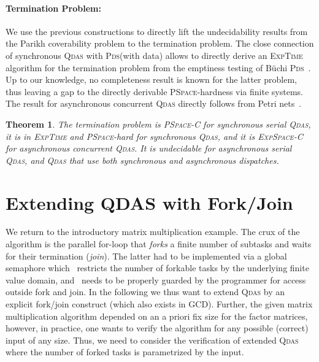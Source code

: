 \documentclass[runningheads,oribibl,]{article}
\newcommand{\pds}{\textsc{Pds}\xspace}
\newcommand{\qdas}{\textsc{Qdas}\xspace}
\newcommand{\dexpspacecomplete}{\textsc{ExpSpace-C}\xspace}
\newcommand{\pspace}{\textsc{PSpace}\xspace}
\newcommand{\pspacecomplete}{\textsc{PSpace-C}\xspace}
\newcommand{\dexptime}{\textsc{ExpTime}\xspace}
\newtheorem{theorem}{Theorem}{}
\begin{document}
\paragraph{\bf Termination Problem:}


We use the previous constructions to directly
lift the undecidability results from the Parikh coverability problem to the termination problem.
The close connection of synchronous \qdas with \pds (with data)
allows to directly derive an \dexptime algorithm for the termination problem from the emptiness testing of
Büchi \pds~\cite{esparza-j-2000-232-a}. Up to our knowledge,
no completeness result is known for the latter problem, thus leaving a gap to the directly derivable \pspace-hardness via finite systems.
The result for  asynchronous concurrent
\qdas directly follows from Petri nets~\cite{lipton,rackoff}.

\begin{theorem}\label{thm:termination}
  The termination problem is  \pspacecomplete for synchronous serial
  \qdas, it is in \dexptime and \pspace-hard for synchronous \qdas,
  and it is \dexpspacecomplete for asynchronous concurrent \qdas.
  It is undecidable for asynchronous serial \qdas, and \qdas that
  use both synchronous and asynchronous dispatches.
\end{theorem}



\section{Extending QDAS with Fork/Join\label{sec:forkjoin}}


We return to the introductory matrix multiplication example. The crux of the
algorithm is the parallel for-loop that \emph{forks} a finite number of subtasks and waits
for their termination (\emph{join}).  The latter had to be implemented via a global
semaphore which ~restricts the number of forkable tasks by the underlying
finite value domain, and ~needs to be properly guarded by the programmer for access outside fork and join.
In the following we thus
want to extend \qdas by an explicit fork/join construct (which also exists in GCD).
Further, the given matrix multiplication algorithm depended on an a priori fix size
for the factor matrices, however,
in practice, one wants to verify the algorithm for any possible (correct) input
of any size. Thus, we need to consider the verification of extended
\qdas  where the number of forked tasks is parametrized by the
input.
\end{document}
